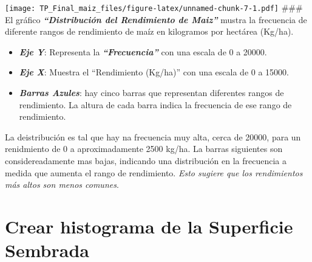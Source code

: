 \documentclass[
]{article}
\newenvironment{Shaded}{\begin{snugshade}}{\end{snugshade}}
\newcommand{\AttributeTok}[1]{\textcolor[rgb]{0.13,0.29,0.53}{#1}}
\newcommand{\DecValTok}[1]{\textcolor[rgb]{0.00,0.00,0.81}{#1}}
\newcommand{\FunctionTok}[1]{\textcolor[rgb]{0.13,0.29,0.53}{\textbf{#1}}}
\newcommand{\NormalTok}[1]{#1}
\newcommand{\SpecialCharTok}[1]{\textcolor[rgb]{0.81,0.36,0.00}{\textbf{#1}}}
\newcommand{\StringTok}[1]{\textcolor[rgb]{0.31,0.60,0.02}{#1}}
\begin{document}
\begin{Shaded}
\end{Shaded}

\texttt{[image: TP\_Final\_maiz\_files/figure-latex/unnamed-chunk-7-1.pdf]}
\#\#\# El gráfico \textbf{\emph{``Distribución del Rendimiento de
Maiz''}} mustra la frecuencia de diferente rangos de rendimiento de maíz
en kilogramos por hectárea (Kg/ha).

\begin{itemize}
\item
  \textbf{\emph{Eje Y}}: Representa la \textbf{\emph{``Frecuencia''}}
  con una escala de 0 a 20000.
\item
  \textbf{\emph{Eje X}}: Muestra el ``Rendimiento (Kg/ha)'' con una
  escala de 0 a 15000.
\item
  \textbf{\emph{Barras Azules}}: hay cinco barras que representan
  diferentes rangos de rendimiento. La altura de cada barra indica la
  frecuencia de ese rango de rendimiento.
\end{itemize}

La deistribución es tal que hay na frecuencia muy alta, cerca de 20000,
para un renidmiento de 0 a aproximadamente 2500 kg/ha. La barras
siguientes son considereadamente mas bajas, indicando una distribución
en la frecuencia a medida que aumenta el rango de rendimiento.
\emph{Esto sugiere que los rendimientos más altos son menos comunes}.

\hypertarget{crear-histograma-de-la-superficie-sembrada}{%
\section{Crear histograma de la Superficie
Sembrada}\label{crear-histograma-de-la-superficie-sembrada}}

\begin{Shaded}
\end{Shaded}
\end{document}
